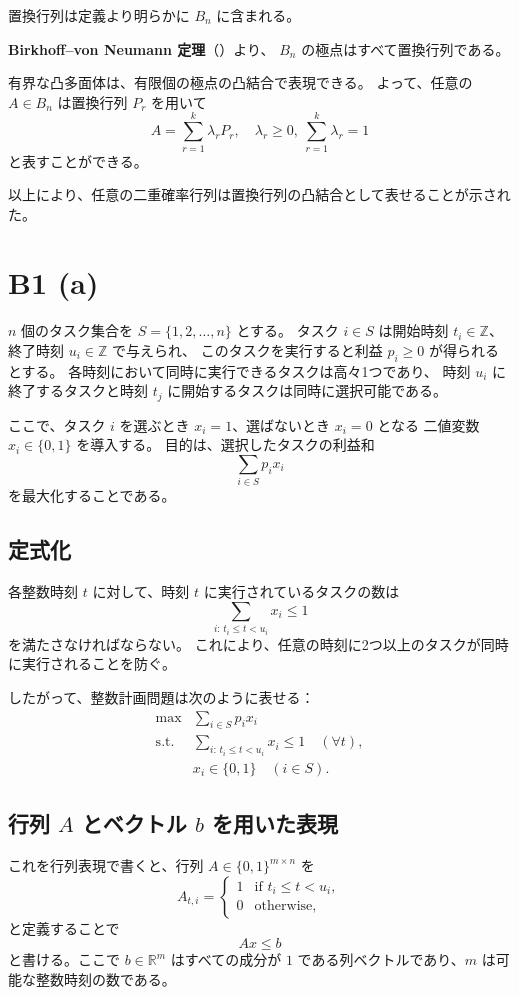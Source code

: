 \documentclass[a4paper]{ltjsarticle}
\begin{document}
置換行列は定義より明らかに $B_n$ に含まれる。

\textbf{Birkhoff–von Neumann 定理}（\cite{micro0616}）より、
   $B_n$ の極点はすべて置換行列である。

有界な凸多面体は、有限個の極点の凸結合で表現できる。
   よって、任意の $A \in B_n$ は置換行列 $P_r$ を用いて
   \[
     A = \sum_{r=1}^k \lambda_r P_r, \quad \lambda_r \ge 0, \ \sum_{r=1}^k \lambda_r = 1
   \]
   と表すことができる。

以上により、任意の二重確率行列は置換行列の凸結合として表せることが示された。

\section*{B1 (a)}

$n$ 個のタスク集合を $S = \{1, 2, \dots, n\}$ とする。
タスク $i \in S$ は開始時刻 $t_i \in \mathbb{Z}$、終了時刻 $u_i \in \mathbb{Z}$ で与えられ、
このタスクを実行すると利益 $p_i \ge 0$ が得られるとする。
各時刻において同時に実行できるタスクは高々1つであり、
時刻 $u_i$ に終了するタスクと時刻 $t_j$ に開始するタスクは同時に選択可能である。

\medskip
ここで、タスク $i$ を選ぶとき $x_i = 1$、選ばないとき $x_i = 0$ となる
二値変数 $x_i \in \{0,1\}$ を導入する。
目的は、選択したタスクの利益和
\[
  \sum_{i \in S} p_i x_i
\]
を最大化することである。

\subsection*{定式化}
各整数時刻 $t$ に対して、時刻 $t$ に実行されているタスクの数は
\[
  \sum_{i:\, t_i \le t < u_i} x_i \le 1
\]
を満たさなければならない。
これにより、任意の時刻に2つ以上のタスクが同時に実行されることを防ぐ。

したがって、整数計画問題は次のように表せる：
\[
  \begin{array}{ll}
    \text{max}   & \displaystyle \sum_{i \in S} p_i x_i \\[6pt]
    \text{s.t.}  & \displaystyle \sum_{i :\, t_i \le t < u_i} x_i \le 1 \quad (\forall t), \\[6pt]
                 & x_i \in \{0,1\} \quad (i \in S).
  \end{array}
\]

\subsection*{行列 $A$ とベクトル $b$ を用いた表現}
これを行列表現で書くと、行列 $A \in \{0,1\}^{m \times n}$ を
\[
  A_{t,i} =
  \begin{cases}
    1 & \text{if } t_i \le t < u_i, \\
    0 & \text{otherwise},
  \end{cases}
\]
と定義することで
\[
  A x \le b
\]
と書ける。ここで $b \in \mathbb{R}^m$ はすべての成分が $1$ である列ベクトルであり、$m$ は可能な整数時刻の数である。
\end{document}
